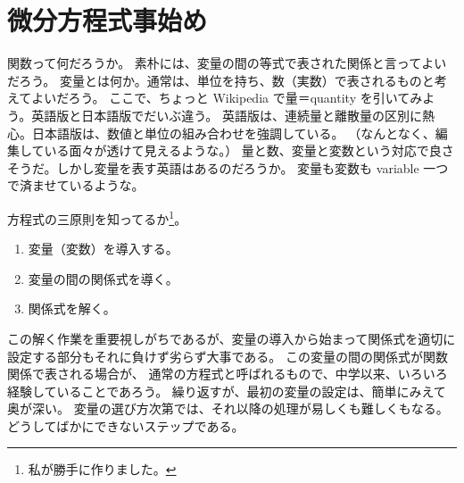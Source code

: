 \documentclass[a4paper]{jsarticle}
\theoremstyle{definition}
\theoremstyle{remark}
\begin{document}




\section{微分方程式事始め}
関数って何だろうか。
素朴には、変量の間の等式で表された関係と言ってよいだろう。
変量とは何か。通常は、単位を持ち、数（実数）で表されるものと考えてよいだろう。
ここで、ちょっと Wikipedia で量＝quantity を引いてみよう。英語版と日本語版でだいぶ違う。
英語版は、連続量と離散量の区別に熱心。日本語版は、数値と単位の組み合わせを強調している。
（なんとなく、編集している面々が透けて見えるような。）
量と数、変量と変数という対応で良さそうだ。しかし変量を表す英語はあるのだろうか。
変量も変数も variable 一つで済ませているような。

方程式の三原則を知ってるか\footnote{私が勝手に作りました。}。
\begin{enumerate}
\item 
変量（変数）を導入する。
\item 
変量の間の関係式を導く。
\item 
関係式を解く。
\end{enumerate}

この解く作業を重要視しがちであるが、変量の導入から始まって関係式を適切に設定する部分もそれに負けず劣らず大事である。
この変量の間の関係式が関数関係で表される場合が、
通常の方程式と呼ばれるもので、中学以来、いろいろ経験していることであろう。
繰り返すが、最初の変量の設定は、簡単にみえて奥が深い。
変量の選び方次第では、それ以降の処理が易しくも難しくもなる。どうしてばかにできないステップである。
\end{document}

